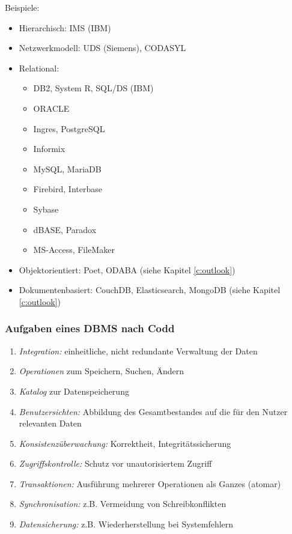             Beispiele:
            \begin{itemize}
            	\item Hierarchisch: IMS (IBM)
            	\item Netzwerkmodell: UDS (Siemens), CODASYL
            	\item Relational:
                	\begin{itemize}
                		\item DB2, System R, SQL/DS (IBM)
                		\item ORACLE
                		\item Ingres, PostgreSQL
                		\item Informix
                		\item MySQL, MariaDB
                		\item Firebird, Interbase
                		\item Sybase
                		\item dBASE, Paradox
                		\item MS-Access, FileMaker
                	\end{itemize}
                \item Objektorientiert: Poet, ODABA (siehe Kapitel \ref{c:outlook})
                \item Dokumentenbasiert: CouchDB, Elasticsearch, MongoDB (siehe Kapitel \ref{c:outlook})
            \end{itemize}

            \subsubsection{Aufgaben eines DBMS nach Codd} %
                \begin{enumerate}
                	\item \textit{Integration:} einheitliche, nicht redundante Verwaltung der Daten
                	\item \textit{Operationen} zum Speichern, Suchen, Ändern
                	\item \textit{Katalog} zur Datenspeicherung
                	\item \textit{Benutzersichten:} Abbildung des Gesamtbestandes auf die für den Nutzer relevanten Daten
                	\item \textit{Konsistenzüberwachung:} Korrektheit, Integritätssicherung
                	\item \textit{Zugriffskontrolle:} Schutz vor unautorisiertem Zugriff
                	\item \textit{Transaktionen:} Ausführung mehrerer Operationen als Ganzes (atomar)
                	\item \textit{Synchronisation:} z.B. Vermeidung von Schreibkonflikten
                	\item \textit{Datensicherung:} z.B. Wiederherstellung bei Systemfehlern
                \end{enumerate}

